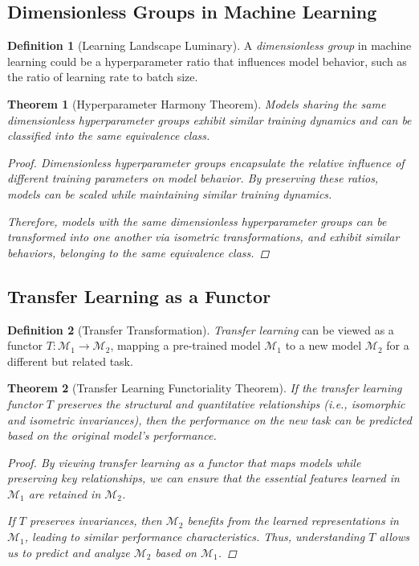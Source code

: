 \documentclass{article}
\newtheorem{theorem}{Theorem}[section]
\theoremstyle{definition}
\newtheorem{definition}{Definition}[section]
\theoremstyle{remark}
\begin{document}
	\subsection{Dimensionless Groups in Machine Learning}
	
	\begin{definition}[Learning Landscape Luminary]
		A \emph{dimensionless group} in machine learning could be a hyperparameter ratio that influences model behavior, such as the ratio of learning rate to batch size.
		
	\end{definition}
	
	\begin{theorem}[Hyperparameter Harmony Theorem]
		Models sharing the same dimensionless hyperparameter groups exhibit similar training dynamics and can be classified into the same equivalence class.
		
		\begin{proof}
			Dimensionless hyperparameter groups encapsulate the relative influence of different training parameters on model behavior. By preserving these ratios, models can be scaled while maintaining similar training dynamics.
			
			Therefore, models with the same dimensionless hyperparameter groups can be transformed into one another via isometric transformations, and exhibit similar behaviors, belonging to the same equivalence class.
		\end{proof}
	\end{theorem}
	
	\subsection{Transfer Learning as a Functor}
	
	\begin{definition}[Transfer Transformation]
		\emph{Transfer learning} can be viewed as a functor $T: \mathcal{M}_1 \rightarrow \mathcal{M}_2$, mapping a pre-trained model $\mathcal{M}_1$ to a new model $\mathcal{M}_2$ for a different but related task.
		
	\end{definition}
	
	\begin{theorem}[Transfer Learning Functoriality Theorem]
		If the transfer learning functor $T$ preserves the structural and quantitative relationships (i.e., isomorphic and isometric invariances), then the performance on the new task can be predicted based on the original model's performance.
		
		\begin{proof}
			By viewing transfer learning as a functor that maps models while preserving key relationships, we can ensure that the essential features learned in $\mathcal{M}_1$ are retained in $\mathcal{M}_2$.
			
			If $T$ preserves invariances, then $\mathcal{M}_2$ benefits from the learned representations in $\mathcal{M}_1$, leading to similar performance characteristics. Thus, understanding $T$ allows us to predict and analyze $\mathcal{M}_2$ based on $\mathcal{M}_1$.
		\end{proof}
	\end{theorem}
	
\end{document}
